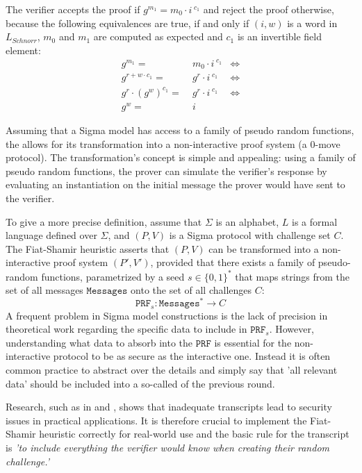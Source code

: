 \begin{example}
The verifier accepts the proof if $g^{m_1} = m_0\cdot i^{\;c_1}$ and reject the proof otherwise, because the following equivalences are true, if and only if $(i,w)$ is a word in $L_{Schnorr}$, $m_0$ and $m_1$ are computed as expected and $c_1$ is an invertible field element:
\begin{align*}
g^{m_1} =\; & m_0\cdot i^{\;c_1} & \Leftrightarrow\\
g^{r+w\cdot c_1} =\; & g^{r} \cdot i^{\;c_1} &\Leftrightarrow \\
g^r \cdot (g^w)^{c_1} =\; & g^{r} \cdot i^{\;c_1} & \Leftrightarrow \\
g^w =\; & i
\end{align*}
\end{example}
Assuming that a Sigma model has access to a family of pseudo random functions, the  allows for its transformation into a non-interactive proof system (a $0$-move protocol). The transformation's concept is simple and appealing: using a family of pseudo random functions, the prover can simulate the verifier's response by evaluating an instantiation on the initial message the prover would have sent to the verifier.

To give a more precise definition, assume that $\Sigma$ is an alphabet, $L$ is a formal language defined over $\Sigma$, and $(P,V)$ is a Sigma protocol with challenge set $C$. The Fiat-Shamir heuristic asserts that $(P,V)$ can be transformed into a non-interactive proof system $(P',V')$, provided that there exists a family of pseudo-random functions, parametrized by a seed $s\in\{0,1\}^*$ that maps strings from the set of all messages $\mathtt{Messages}$ onto the set of all challenges $C$:
\begin{equation}
\mathtt{PRF}_s: \mathtt{Messages}^* \to C    
\end{equation}
A frequent problem in Sigma model constructions is the lack of precision in theoretical work regarding the specific data to include in $\mathtt{PRF}_s$. However, understanding what data to absorb into the $\mathtt{PRF}$ is essential for the non-interactive protocol to be as secure as the interactive one. Instead it is often common practice to abstract over the details and simply say that 'all relevant data' should be included into a so-called  of the previous round.

Research, such as in \cite{dao-23} and \cite{bernhard-16}, shows that inadequate transcripts lead to security issues in practical applications. It is therefore crucial to implement the Fiat-Shamir heuristic correctly for real-world use and the basic rule for the transcript is \textit{'to include everything the verifier would know when creating their random challenge.'}

